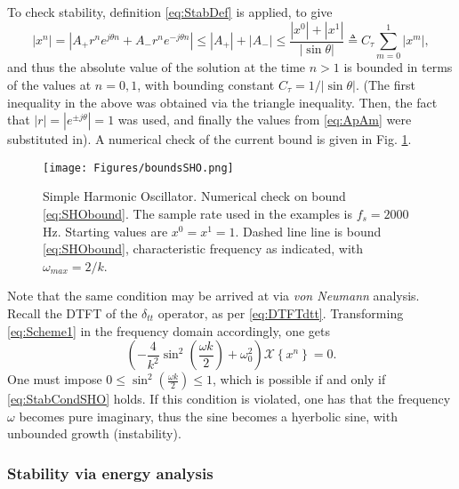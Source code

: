 \documentclass[11pt,twoside,a4paper,english]{book}
\newcommand{\dtt}{\delta_{tt}}
\begin{document}
To check stability, definition \eqref{eq:StabDef} is applied, to give
\begin{equation}\label{eq:SHObound} 
    |x^n| = |A_+ r^n e^{j \theta n} + A_- r^n e^{-j \theta n}| \leq |A_+| + |A_-| \leq \frac{|x^0|+|x^1|}{|\sin \theta|} \triangleq C_\tau \sum_{m=0}^1 |x^m|,
\end{equation}
and thus the absolute value of the solution at the time $n>1$ is bounded in terms of the values at $n=0,1$, with bounding constant $C_\tau = 1/|\sin\theta|$. (The first inequality in the above was obtained via the triangle inequality. Then, the fact that $|r|=|e^{\pm j\theta}|=1$ was used, and finally the values from \eqref{eq:ApAm} were substituted in). A numerical check of the current bound is given in Fig. \ref{fig:SHObounds}.
\begin{figure}
    \texttt{[image: Figures/boundsSHO.png]}
    \caption{Simple Harmonic Oscillator. Numerical check on bound \eqref{eq:SHObound}. The sample rate used in the examples is $f_s = 2000$ Hz. Starting values are $x^0 = x^1 = 1$. Dashed line line is bound \eqref{eq:SHObound}, characteristic frequency as indicated, with $\omega_{max}=2/k$.}\label{fig:SHObounds}
\end{figure}
Note that the same condition may be arrived at via \emph{von Neumann} analysis. Recall the DTFT of the $\dtt$ operator, as per \eqref{eq:DTFTdtt}. Transforming \eqref{eq:Scheme1} in the frequency domain accordingly, one gets
\begin{equation}
\left(-\frac{4}{k^2}\sin^2\left( \frac{\omega k}{2}\right) + \omega_0^2\right)\mathcal{X}\left\{ x^n\right\} = 0.
\end{equation}
One must impose  $0 \leq \sin^2\left( \frac{\omega k}{2}\right) \leq 1$, which is possible if and only if \eqref{eq:StabCondSHO} holds. If this condition is violated, one has that the frequency $\omega$ becomes pure imaginary, thus the sine becomes a hyerbolic sine, with unbounded growth (instability).




\subsubsection{Stability via energy analysis}
\end{document}
